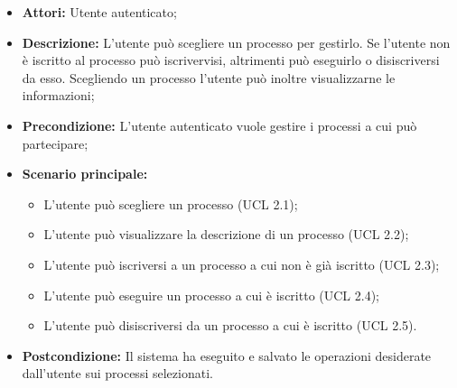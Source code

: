 \begin{itemize}
\item \textbf{Attori:} Utente autenticato;
\item \textbf{Descrizione:} L'utente può scegliere un processo per gestirlo.
Se l'utente non è iscritto al processo può iscrivervisi, altrimenti può eseguirlo o disiscriversi da esso.
Scegliendo un processo l'utente può inoltre visualizzarne le informazioni;
\item \textbf{Precondizione:} L'utente autenticato vuole gestire i processi a cui può partecipare;
\item \textbf{Scenario principale:}
\begin{itemize}
\item L'utente può scegliere un processo (UCL 2.1);
\item L'utente può visualizzare la descrizione di un processo (UCL 2.2);
\item L'utente può iscriversi a un processo a cui non è già iscritto (UCL 2.3);
\item L'utente può eseguire un processo a cui è iscritto (UCL 2.4);
\item L'utente può disiscriversi da un processo a cui è iscritto (UCL 2.5).
\end{itemize}
\item \textbf{Postcondizione:} Il sistema ha eseguito e salvato le operazioni desiderate dall'utente sui processi selezionati.
\end{itemize}

\hypertarget{L2.1}{}
